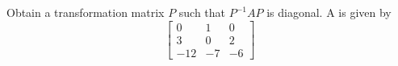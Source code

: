 \item Obtain a transformation matrix $P$ such that $P^{-1}AP$ is diagonal.
A is given by
\begin{equation*}
 \begin{bmatrix}
  0 & 1 & 0\\
  3 & 0 & 2\\
  -12 & -7 & -6
 \end{bmatrix}
\end{equation*}
